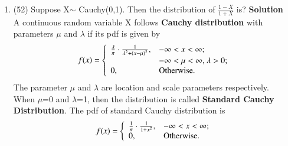 \documentclass[journal,12pt,twocolumn]{IEEEtran}
\begin{document}
\begin{enumerate}[label=\arabic*.,ref=\theenumi]
\item
(52) Suppose X$\sim$ Cauchy(0,1). Then the distribution of
$\frac{1-X}{1+X}$ is?
\textbf{Solution} \\
A continuous random variable X follows \textbf{Cauchy distribution} with parameters $\mu$ and $\lambda$ if its pdf is given by
\\
    \begin{equation*} f(x) =\left\{ \begin{array}{ll} \frac{\lambda}{\pi}\cdot \frac{1}{\lambda^2+(x-\mu)^2}, & \hbox{$-\infty < x< \infty$;} \\ & \hbox{$-\infty < \mu< \infty$, $\lambda>0$;} \\ 0, & \hbox{Otherwise.} \end{array} \right. \end{equation*}
The parameter $\mu$ and $\lambda$ are location and scale parameters respectively. 
\\
When $\mu$=0 and $\lambda$=1, then the distribution is called \textbf{Standard Cauchy Distribution}. The pdf of standard Cauchy distribution is
\\
\begin{equation*} f(x) =\left\{ \begin{array}{ll} \frac{1}{\pi}\cdot \frac{1}{1+x^2}, & \hbox{$-\infty < x< \infty$;} \\ 0, & \hbox{Otherwise.} \end{array} \right. \end{equation*}


\end{enumerate}
\end{document}
